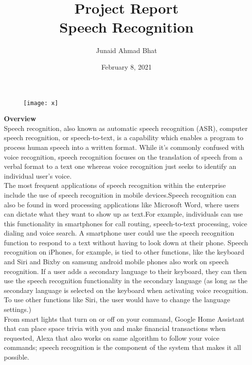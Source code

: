 \documentclass[a4paper,12pt]{article}
\begin{document}
\title{Project Report\\
Speech Recognition}
\author{Junaid Ahmad Bhat}
\date{February 8, 2021}
\maketitle

\begin{figure}[h]
\centering
\texttt{[image: x]}
\caption{}
\end{figure}


\textbf{Overview}\\

Speech recognition, also known as automatic speech recognition (ASR), computer speech recognition, or speech-to-text, is a capability which enables a program to process human speech into a written format. While it’s commonly confused with voice recognition, speech recognition focuses on the translation of speech from a verbal format to a text one whereas voice recognition just seeks to identify an individual user’s voice.\\

The most frequent applications of speech recognition within the enterprise include the use of speech recognition in mobile devices.Speech recognition can also be found in word processing applications like Microsoft Word, where users can dictate what they want to show up as text.For example, individuals can use this functionality in smartphones for call routing, speech-to-text processing, voice dialing and voice search. A smartphone user could use the speech recognition function to respond to a text without having to look down at their phone. Speech recognition on iPhones, for example, is tied to other functions, like the keyboard and Siri and Bixby on samsung android mobile phones also work on speech recognition. If a user adds a secondary language to their keyboard, they can then use the speech recognition functionality in the secondary language (as long as the secondary language is selected on the keyboard when activating voice recognition. To use other functions like Siri, the user would have to change the language settings.)\\

From smart lights that turn on or off on your command, Google Home Assistant that can place space trivia with you and make financial transactions when requested, Alexa that also works on same algorithm to follow your voice commands; speech recognition is the component of the system that makes it all possible.\\
\end{document}
